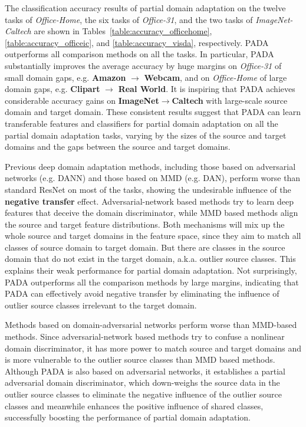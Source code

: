 \documentclass[runningheads]{llncs}
\begin{document}
The classification accuracy results of partial domain adaptation on the twelve tasks of \textit{Office-Home}, the six tasks of \textit{Office-31}, and the two tasks of \textit{ImageNet-Caltech} are shown in Tables~\ref{table:accuracy_officehome}, \ref{table:accuracy_officeic}, and \ref{table:accuracy_visda}, respectively. PADA outperforms all comparison methods on all the tasks. In particular, PADA substantially improves the average accuracy by huge margins on \textit{Office-31} of small domain gaps, e.g. \textbf{Amazon} $\rightarrow$ \textbf{Webcam}, and on \textit{Office-Home} of large domain gaps, e.g. \textbf{Clipart} $\rightarrow$ \textbf{Real World}. It is inspiring that PADA achieves considerable accuracy gains on \textbf{ImageNet}$\rightarrow$\textbf{Caltech} with large-scale source domain and target domain. These consistent results suggest that PADA can learn transferable features and classifiers for partial domain adaptation on all the partial domain adaptation tasks, varying by the sizes of the source and target domains and the gaps between the source and target domains. 

Previous deep domain adaptation methods, including those based on adversarial networks (e.g. DANN) and those based on MMD (e.g. DAN), perform worse than standard ResNet on most of the tasks, showing the undesirable influence of the \textbf{negative transfer} effect. 
Adversarial-network based methods try to learn deep features that deceive the domain discriminator, while MMD based methods align the source and target feature distributions. Both mechanisms will mix up the whole source and target domains in the feature space, since they aim to match all classes of source domain to target domain. But there are classes in the source domain that do not exist in the target domain, a.k.a. outlier source classes. This explains their weak performance for partial domain adaptation.
Not surprisingly, PADA outperforms all the comparison methods by large margins, indicating that PADA can effectively avoid negative transfer by eliminating the influence of outlier source classes irrelevant to the target domain. 

Methods based on domain-adversarial networks perform worse than MMD-based methods. Since adversarial-network based methods try to confuse a nonlinear domain discriminator, it has more power to match source and target domains and is more vulnerable to the outlier source classes than MMD based methods. 
Although PADA is also based on adversarial networks, it establishes a partial adversarial domain discriminator,  which down-weighs the source data in the outlier source classes to eliminate the negative influence of the outlier source classes and meanwhile enhances the positive influence of shared classes, successfully boosting the performance of partial domain adaptation. 
\end{document}
